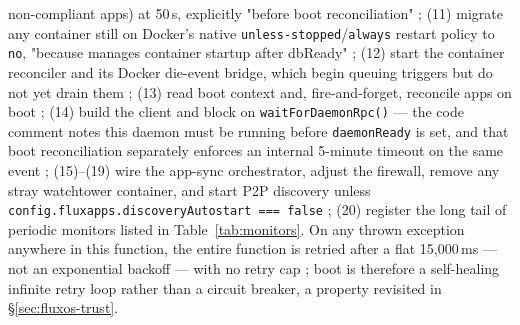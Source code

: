 non-compliant apps) at 50\,s, explicitly "before boot reconciliation"
; (11) migrate any container still
on Docker's native \texttt{unless-stopped}\slash\texttt{always} restart policy to \texttt{no}, "because
\FluxOS manages container startup after dbReady" 
; (12) start the container
reconciler and its Docker die-event bridge, which begin queuing triggers but do not yet drain them
; (13) read boot context and, fire-and-forget,
reconcile apps on boot ; (14) build
the \fluxd client and block on \texttt{wait\allowbreak{}For\allowbreak{}Daemon\allowbreak{}Rpc()} — the code comment notes this daemon
must be running before \texttt{daemonReady} is set, and that boot reconciliation separately
enforces an internal 5-minute timeout on the same event
; (15)--(19) wire the app-sync
orchestrator, adjust the firewall, remove any stray watchtower container, and start P2P discovery
unless \texttt{config.\allowbreak{}fluxapps.\allowbreak{}discoveryAutostart === false}
; (20) register the long tail of
periodic monitors listed in Table~\ref{tab:monitors}. On any thrown exception anywhere in this function,
the entire function is retried after a flat 15{,}000\,ms — not an exponential backoff — with no
retry cap ; boot is therefore a
self-healing infinite retry loop rather than a circuit breaker, a property revisited in
\S\ref{sec:fluxos-trust}.

